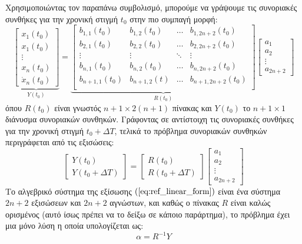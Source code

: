 Χρησιμοποιώντας τον παραπάνω συμβολισμό, μπορούμε να γράψουμε τις συνοριακές συνθήκες για την χρονική στιγμή $t_0$ στην πιο συμπαγή μορφή:
\begin{equation*}
	\underbrace{
	\begin{bmatrix} x_1(t_0) \\ x_1(t_0) \\ \vdots \\ x_n(t_0) \\ \dot{x}_n(t_0)
	\end{bmatrix}}_{Y(t_0)}
	= 
	\underbrace{
	\begin{bmatrix} 
	b_{1,1}(t_0)   & b_{1,2}(t_0)   & \dots  & b_{1,2n+2}(t_0)   \\
	b_{2,1}(t_0)   & b_{2,2}(t_0)   & \dots  & b_{2,2n+2}(t_0)   \\
	\vdots       & \vdots       & \ddots & \vdots          \\
	b_{n,1}(t_0)   & b_{n,2}(t_0)   & \dots  & b_{n,2n+2}(t_0)   \\
	b_{n+1,1}(t_0) & b_{n+1,2}(t) & \dots  & b_{n+1,2n+2}(t_0) \\
	\end{bmatrix}
	}_{R(t_0)}
	\begin{bmatrix} a_1 \\ a_2 \\ \vdots \\ a_{2n+2}
	\end{bmatrix}
\end{equation*}
όπου $R(t_0)$ είναι γνωστός $n+1 \times 2(n+1)$ πίνακας και $Y(t_0)$ το $n+1 \times 1$ διάνυσμα συνοριακών συνθηκών. Γράφοντας σε  αντίστοιχη τις συνοριακές συνθήκες για την χρονική στιγμή $t_0+\Delta T$, τελικά το πρόβλημα συνοριακών συνθηκών περιγράφεται από τις εξισώσεις:
\begin{equation}
	\begin{bmatrix} Y(t_0) \\ Y(t_0 + \Delta T)
	\end{bmatrix} = 
	\begin{bmatrix}
	R(t_0) \\ R(t_0+\Delta T)
	\end{bmatrix}  \begin{bmatrix} a_1 \\ a_2 \\ \vdots \\ a_{2n+2}
	\end{bmatrix}
	\label{eq:ref_linear_form}
\end{equation}
Το αλγεβρικό σύστημα της εξίσωσης $(\ref{eq:ref_linear_form})$ είναι ένα σύστημα $2n+2$ εξισώσεων και $2n+2$ αγνώστων, και καθώς ο πίνακας $R$ είναι καλώς ορισμένος (αυτό ίσως πρέπει να το δείξω σε κάποιο παράρτημα), το πρόβλημα έχει μια μόνο λύση η οποία υπολογίζεται ως:
\begin{equation*}
	\alpha = R^{-1} Y
\end{equation*}

